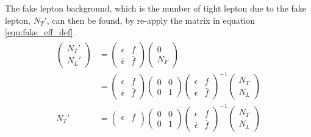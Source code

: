 The fake lepton background, which is the number of tight lepton due to the fake lepton, $N_T'$, can then be found, by re-apply the matrix in equation \ref{equ:fake_eff_def}.
\begin{align}
\begin{split}
\left( \begin{array}{c}
N_T' \\
N_L'
\end{array} \right)
&=
\left( \begin{array}{cc}
\epsilon & f \\
\bar{\epsilon} & \bar{f}
\end{array} \right)
\left( \begin{array}{c}
0 \\
N_F
\end{array} \right) \\
&=
\left( \begin{array}{cc}
\epsilon & f \\
\bar{\epsilon} & \bar{f}
\end{array} \right)
\left( \begin{array}{cc}
0 & 0 \\
0 & 1
\end{array} \right)
\left( \begin{array}{cc}
\epsilon & f \\
\bar{\epsilon} & \bar{f}
\end{array} \right)^{-1}
\left( \begin{array}{c}
N_T \\
N_L
\end{array} \right) \\
N_T'
&=
\left( \begin{array}{cc}
\epsilon & f \\
\end{array} \right)
\left( \begin{array}{cc}
0 & 0 \\
0 & 1
\end{array} \right)
\left( \begin{array}{cc}
\epsilon & f \\
\bar{\epsilon} & \bar{f}
\end{array} \right)^{-1}
\left( \begin{array}{c}
N_T \\
N_L
\end{array} \right) \\
\end{split}
\end{align}

